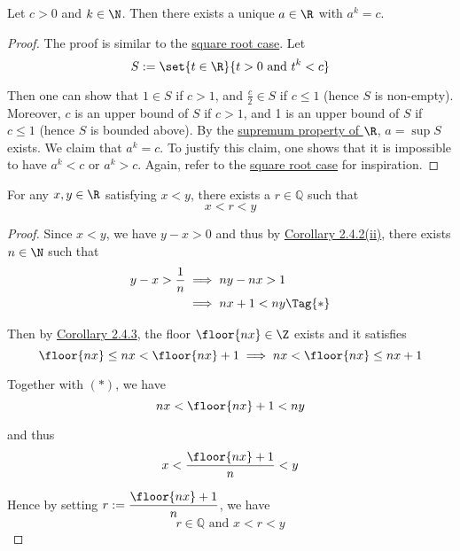Let $c>0$ and $k\in\N$. Then there exists a unique $a\in\R$ with $a^k=c$.

\begin{proof}
  The proof is similar to the \href{b88beb7}{square root case}. Let
  $$
    S:=\set{t\in\R}{t>0\text{ and }t^k<c}
  $$

  Then one can show that $1\in S$ if $c>1$, and $\frac c2\in S$ if $c\leq1$
  (hence $S$ is non-empty). Moreover, $c$ is an upper bound of $S$ if $c>1$, and
  1 is an upper bound of $S$ if $c\leq1$ (hence $S$ is bounded above). By the
  \href{f330cf9}{supremum property of $\R$}, $a=\sup S$ exists. We claim that
  $a^k=c$. To justify this claim, one shows that it is impossible to have $a^k<c$
  or $a^k>c$. Again, refer to the \href{b88beb7}{square root case} for
  inspiration.
\end{proof}

\label{d0c9c52}

For any $x,y\in\R$ satisfying $x<y$, there exists a $r\in\mathbb Q$ such that
$$
  x<r<y
$$

\begin{proof}
  Since $x<y$, we have $y-x>0$ and thus by \href{d845856}{Corollary 2.4.2(ii)},
  there exists $n\in\N$ such that
  \begin{align*}
    y-x>\frac1n &\implies ny-nx>1        \\
                &\implies nx+1<ny\Tag{*}
  \end{align*}

  Then by \href{abc7dbd}{Corollary 2.4.3}, the floor $\floor{nx}\in\Z$ exists and
  it satisfies
  $$
    \floor{nx}\leq nx <\floor{nx}+1\implies nx<\floor{nx}\leq nx+1
  $$

  Together with $(*)$, we have
  $$
    nx<\floor{nx}+1<ny
  $$

  and thus
  $$
    x<\frac{\floor{nx}+1}{n}<y
  $$

  Hence by setting $r:=\dfrac{\floor{nx}+1}{n}$, we have
  $$
    r\in\mathbb Q\text{ and }x<r<y
  $$
\end{proof}
